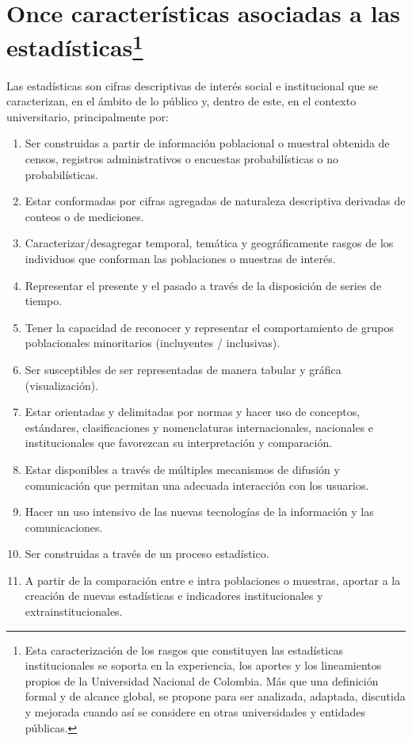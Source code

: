 \documentclass[
]{book}
\providecommand{\tightlist}{%
  \setlength{\itemsep}{0pt}\setlength{\parskip}{0pt}}
\begin{document}
\hypertarget{once-caracteruxedsticas-asociadas-a-las-estaduxedsticas}{%
\section[\textbf{Once características asociadas a las estadísticas}]{\texorpdfstring{\textbf{Once características asociadas a las estadísticas}\footnote{Esta caracterización de los rasgos que constituyen las estadísticas institucionales se soporta en la experiencia, los aportes y los lineamientos propios de la Universidad Nacional de Colombia. Más que una definición formal y de alcance global, se propone para ser analizada, adaptada, discutida y mejorada cuando así se considere en otras universidades y entidades públicas.}}{Once características asociadas a las estadísticas}}\label{once-caracteruxedsticas-asociadas-a-las-estaduxedsticas}}

Las estadísticas son cifras descriptivas de interés social e institucional que se caracterizan, en el ámbito de lo público y, dentro de este, en el contexto universitario, principalmente por:

\begin{enumerate}
\def\labelenumi{\arabic{enumi}.}
\tightlist
\item
  Ser construidas a partir de información poblacional o muestral obtenida de censos, registros administrativos o encuestas probabilísticas o no probabilísticas.
\item
  Estar conformadas por cifras agregadas de naturaleza descriptiva derivadas de conteos o de mediciones.
\item
  Caracterizar/desagregar temporal, temática y geográficamente rasgos de los individuos que conforman las poblaciones o muestras de interés.
\item
  Representar el presente y el pasado a través de la disposición de series de tiempo.
\item
  Tener la capacidad de reconocer y representar el comportamiento de grupos poblacionales minoritarios (incluyentes / inclusivas).
\item
  Ser susceptibles de ser representadas de manera tabular y gráfica (visualización).
\item
  Estar orientadas y delimitadas por normas y hacer uso de conceptos, estándares, clasificaciones y nomenclaturas internacionales, nacionales e institucionales que favorezcan su interpretación y comparación.
\item
  Estar disponibles a través de múltiples mecanismos de difusión y comunicación que permitan una adecuada interacción con los usuarios.
\item
  Hacer un uso intensivo de las nuevas tecnologías de la información y las comunicaciones.
\item
  Ser construidas a través de un proceso estadístico.
\item
  A partir de la comparación entre e intra poblaciones o muestras, aportar a la creación de nuevas estadísticas e indicadores institucionales y extrainstitucionales.
\end{enumerate}
\end{document}
